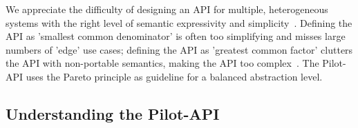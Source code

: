 \documentclass[conference]{IEEEtran}
\begin{document}
We appreciate the difficulty of designing an API for multiple, heterogeneous
systems with the right level of semantic expressivity and
simplicity~\cite{Lampson:1983:HCS:800217.806614}. Defining the API as
'smallest common denominator' is often too simplifying and misses large
numbers of 'edge' use cases; defining the API as 'greatest common factor'
clutters the API with non-portable semantics, making the API too
complex~\cite{leaky_abstractions}. The Pilot-API uses the Pareto principle as
guideline for a balanced abstraction level.










\upp
\subsection{Understanding the Pilot-API}
\end{document}
